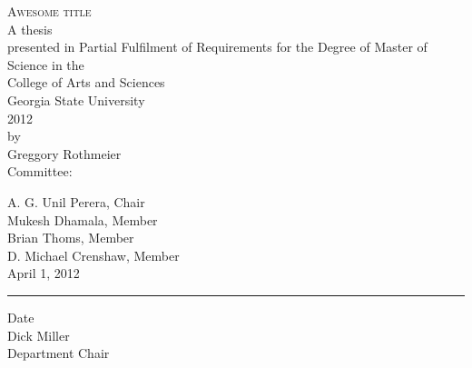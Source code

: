 \begin{doublespace}
\begin{center}
  \textsc{Awesome title}\\
  \vspace{0.4in}
  A thesis\\
  presented in Partial Fulfilment of Requirements for the Degree of Master of Science in the\\
  College of Arts and Sciences\\
  Georgia State University\\
  2012\\
  by\\
  Greggory Rothmeier\\
  \vspace*{\fill}
  Committee:\\
  \begin{singlespace}
    \signhere
    A. G. Unil Perera, Chair\\
    \signhere
    Mukesh Dhamala, Member\\
    \signhere
    Brian Thoms, Member\\
    \signhere
    D. Michael Crenshaw, Member \\
    \vspace{0.2in}
    April 1, 2012\\
    \rule{\linewidth}{0.5mm}
    Date\\
    \signhere
    Dick Miller\\
    Department Chair\\
    \vspace{0.1in}
  \end{singlespace}
\end{center}
\end{doublespace}